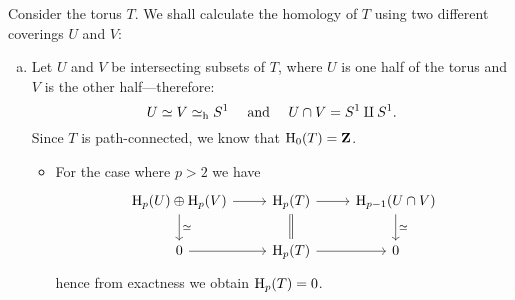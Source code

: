 \begin{example}[Torus]
    \label{exp:torus-homology}
    Consider the torus \(T\). We shall calculate the homology of \(T\) using two
    different coverings \(U\) and \(V\):
    \begin{enumerate}[(a)]\setlength\itemsep{0em}
        \item Let \(U\) and \(V\) be intersecting subsets of \(T\), where \(U\) is one
              half of the torus and \(V\) is the other half---therefore:
              \[
                  U \simeq V \simeq_{\text{h}} S^1 \quad \text{ and } \quad U \cap V = S^1 \amalg S^1.
              \]
              Since \(T\) is path-connected, we know that \(\operatorname{H}_0(T) = \mathbf{Z}\).
              \begin{itemize}\setlength\itemsep{0em}
                  \item For the case where \(p > 2\) we have
                        \[
                            \begin{tikzcd}
                                \Hmlg_p(U) \oplus \Hmlg_p(V) \ar[d, "\dis"]
                                \ar[r]
                                &\Hmlg_p(T) \ar[d, equals]
                                \ar[r]
                                &\Hmlg_{p-1}(U \cap V) \ar[d, "\dis"]
                                \\
                                0 \ar[r] &\Hmlg_p(T) \ar[r] &0
                            \end{tikzcd}
                        \]
                        hence from exactness we obtain \(\operatorname{H}_p(T) = 0\).


\end{itemize}
\end{enumerate}
\end{example}
